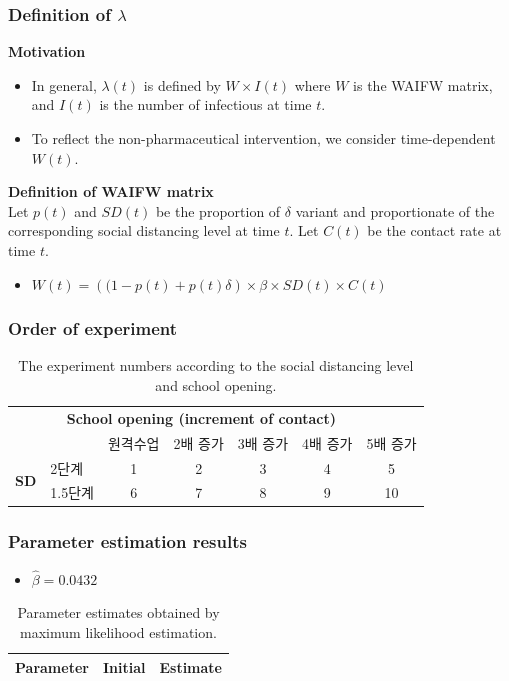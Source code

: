 \documentclass[aspectratio=169, 9pt, xcolor=dvipsnames]{beamer}
\begin{document}
	\begin{frame}\frametitle{Definition of $\lambda$}
		\textbf{Motivation}
	    \begin{itemize}
	    	\item In general, $\lambda(t)$ is defined by $W \times I(t)$ where $W$ is the WAIFW matrix, and $I(t)$ is the number of infectious at time $t$.
	    	\item To reflect the non-pharmaceutical intervention, we consider time-dependent $W(t)$.
	    \end{itemize}
	    \vspace{0.5cm}
	    \textbf{Definition of WAIFW matrix} \\
	    Let $p(t)$ and $SD(t)$ be the proportion of $\delta$ variant and proportionate of the corresponding social distancing level at time $t$. Let $C(t)$ be the contact rate at time $t$.
	    \begin{itemize}
	    	\item $W(t) = \left((1 - p(t) + p(t) \delta\right) \times \beta \times SD(t) \times C(t)$
	    \end{itemize}
	\end{frame}

	\begin{frame}\frametitle{Order of experiment}
		\begin{table}
			\begin{tabular}{clccccc}
				\toprule
				& \multicolumn{5}{c}{\textbf{School opening (increment of contact)}} \\
				\cmidrule{3-7}
				&  & 원격수업 & 2배 증가 & 3배 증가 & 4배 증가 & 5배 증가 \\
				\midrule
				\multirow{2}{*}{\textbf{SD}\footnotemark[3]} & 2단계 & 1 & 2 & 3 & 4 & 5 \\
				& 1.5단계 & 6 & 7 & 8 & 9 & 10 \\
				\bottomrule
			\end{tabular}
			\caption{The experiment numbers according to the social distancing level and school opening.}
		\end{table}
	\end{frame}

	\begin{frame}\frametitle{Parameter estimation results}
		\begin{itemize}
			\item $\hat{\beta} = 0.0432$
		\end{itemize}
	    \begin{table}
	    	\begin{tabular}{crr}
	    		\toprule
	    		\textbf{Parameter} & \textbf{Initial} & \textbf{Estimate} \\
	    		\midrule
	    		
	    		\bottomrule
	    	\end{tabular}
	    	\caption{Parameter estimates obtained by maximum likelihood estimation.}
	    \end{table}
	\end{frame}
\end{document}
